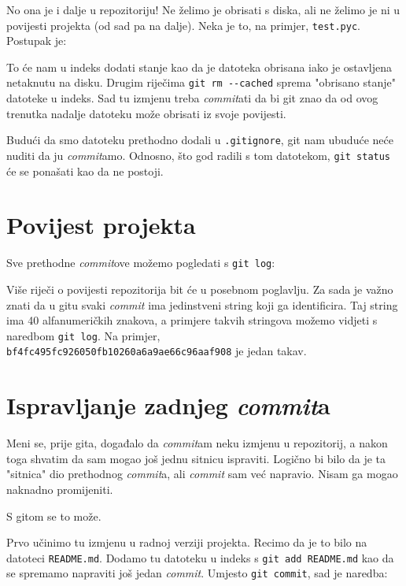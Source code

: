 No ona je i dalje u repozitoriju!
Ne želimo je obrisati s diska, ali ne želimo je ni u povijesti projekta (od sad pa na dalje).
Neka je to, na primjer, \verb+test.pyc+.
Postupak je:


To će nam u indeks dodati stanje kao da je datoteka obrisana iako je ostavljena netaknutu na disku.
Drugim riječima \verb+git rm --cached+ sprema "obrisano stanje" datoteke u indeks.
Sad tu izmjenu treba \emph{commit}ati da bi git znao da od ovog trenutka nadalje datoteku može obrisati iz svoje povijesti.

Budući da smo datoteku prethodno dodali u \verb+.gitignore+, git nam ubuduće neće nuditi da ju \emph{commit}amo.
Odnosno, što god radili s tom datotekom, \verb+git status+ će se ponašati kao da ne postoji.

\section*{Povijest projekta}

Sve prethodne \emph{commit}ove možemo pogledati s \verb+git log+:



Više riječi o povijesti repozitorija bit će u posebnom poglavlju. 
Za sada je važno znati da u gitu svaki \emph{commit} ima jedinstveni string koji ga identificira.
Taj string ima 40 alfanumeričkih znakova, a primjere takvih stringova možemo vidjeti s naredbom \verb+git log+.
Na primjer, \\\verb+bf4fc495fc926050fb10260a6a9ae66c96aaf908+ je jedan takav.

\section*{Ispravljanje zadnjeg \emph{commit}a}

Meni se, prije gita, događalo da \emph{commit}am neku izmjenu u repozitorij, a nakon toga shvatim da sam mogao još jednu sitnicu ispraviti.
Logično bi bilo da je ta "sitnica" dio prethodnog \emph{commit}a, ali \emph{commit} sam već napravio.
Nisam ga mogao naknadno promijeniti.

S gitom se to može.

Prvo učinimo tu izmjenu u radnoj verziji projekta. 
Recimo da je to bilo na datoteci \verb+README.md+.
Dodamo tu datoteku u indeks s \verb+git add README.md+ kao da se spremamo napraviti još jedan \emph{commit}.
Umjesto \verb+git commit+, sad je naredba:


